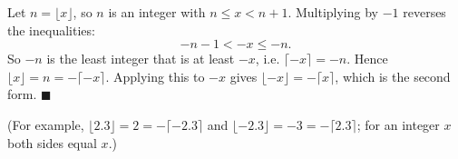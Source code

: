 Let $n=\lfloor x\rfloor$, so $n$ is an integer with $n\le x<n+1$. Multiplying by $-1$ reverses the inequalities:
\[
-n-1<-x\le-n .
\]
So $-n$ is the least integer that is at least $-x$, i.e. $\lceil -x\rceil=-n$. Hence $\lfloor x\rfloor=n=-\lceil -x\rceil$. Applying this to $-x$ gives $\lfloor -x\rfloor=-\lceil x\rceil$, which is the second form. $\blacksquare$

(For example, $\lfloor 2.3\rfloor=2=-\lceil-2.3\rceil$ and $\lfloor-2.3\rfloor=-3=-\lceil2.3\rceil$; for an integer $x$ both sides equal $x$.)
